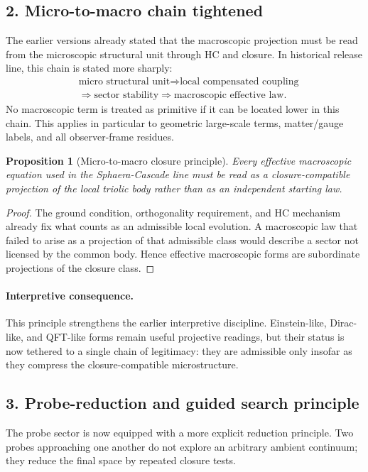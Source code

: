 \documentclass[12pt,a4paper]{article}
\DeclareRobustCommand{\QSCver}[1]{archival stage}
\newtheorem{proposition}[theorem]{Proposition}
\renewcommand{\QSCver}[1]{historical release line}
\begin{document}
\subsection*{2. Micro-to-macro chain tightened}
The earlier versions already stated that the macroscopic projection must be read
from the microscopic structural unit through HC and closure. In \QSCver{v1.4.0},
this chain is stated more sharply:
\[
\begin{aligned}
&\text{micro structural unit} \Longrightarrow \text{local compensated coupling}\\
&\Longrightarrow \text{sector stability} \Longrightarrow \text{macroscopic effective law}.
\end{aligned}
\]
No macroscopic term is treated as primitive if it can be located lower in this
chain. This applies in particular to geometric large-scale terms, matter/gauge
labels, and all observer-frame residues.

\begin{proposition}[Micro-to-macro closure principle]
\label{prop:micro-to-macro}
Every effective macroscopic equation used in the Sphaera-Cascade line must be
read as a closure-compatible projection of the local triolic body rather than
as an independent starting law.
\end{proposition}

\begin{proof}
The ground condition, orthogonality requirement, and HC mechanism already fix
what counts as an admissible local evolution. A macroscopic law that failed to
arise as a projection of that admissible class would describe a sector not
licensed by the common body. Hence effective macroscopic forms are subordinate
projections of the closure class.
\end{proof}

\paragraph{Interpretive consequence.}
This principle strengthens the earlier interpretive discipline. Einstein-like,
Dirac-like, and QFT-like forms remain useful projective readings, but their
status is now tethered to a single chain of legitimacy: they are admissible
only insofar as they compress the closure-compatible microstructure.

\subsection*{3. Probe-reduction and guided search principle}
The probe sector is now equipped with a more explicit reduction principle. Two
probes approaching one another do not explore an arbitrary ambient continuum;
they reduce the final space by repeated closure tests.
\end{document}
